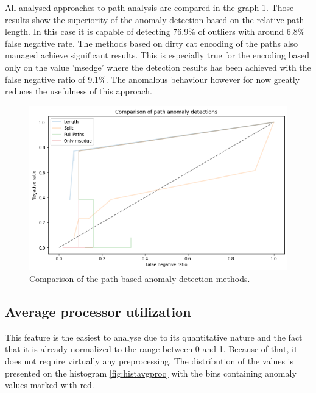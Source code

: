 \documentclass[a4paper,twoside,12pt]{book}
\begin{document}
All analysed approaches to path analysis are compared in the graph \ref{fig:pathcomp}. Those results show the
superiority of the anomaly detection based on the relative path length. In this case it is capable of detecting 
76.9\% of outliers with around 6.8\% false negative rate. The methods based on dirty cat encoding of the paths also managed 
achieve significant results. This is especially true for the encoding based only on the value 'msedge' where 
the detection results has been achieved with the false negative ratio of 9.1\%. The anomalous behaviour however for now
greatly reduces the usefulness of this approach.

\begin{figure}
	\centering
	\includegraphics[scale=0.9]{images/PathCompGraph2}
	\caption{Comparison of the path based anomaly detection methods.}
	\label{fig:pathcomp}
 \end{figure}

\subsection{Average processor utilization}

This feature is the easiest to analyse due to its quantitative nature and the fact that it is
already normalized to the range between 0 and 1. Because of that, it does not require virtually 
any preprocessing. The distribution of the values is presented on the 
histogram \ref{fig:histavgproc} with the bins containing anomaly values marked with red. 
\end{document}
